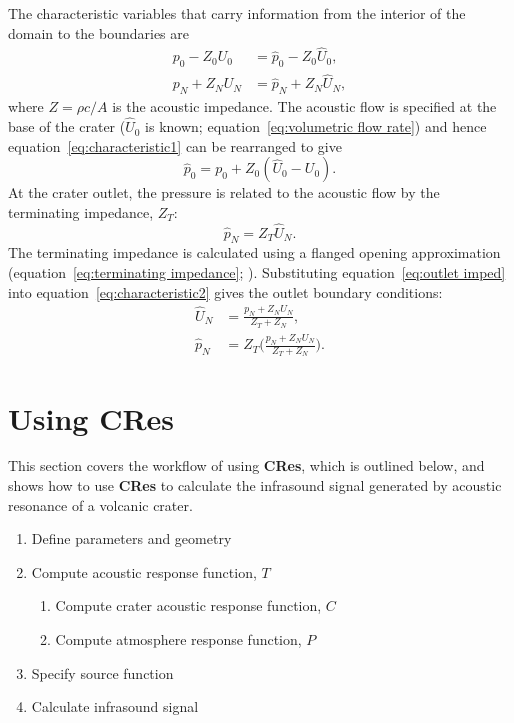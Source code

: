 \documentclass[10pt]{article}
\begin{document}
The characteristic variables that carry information from the interior of the domain to the boundaries are
\begin{align}
p_0-Z_0 U_0 & =\hat{p}_0-Z_0 \hat{U}_0,
\label{eq:characteristic1} \\
p_N+Z_N U_N & = \hat{p}_N+Z_N \hat{U}_N,
\label{eq:characteristic2}
\end{align}
where $Z = \rho c / A$ is the acoustic impedance. The acoustic flow is specified at the base of the crater ($\hat{U}_0$ is known; equation~\ref{eq:volumetric flow rate}) and hence equation~\ref{eq:characteristic1} can be rearranged to give
\begin{equation}
\hat{p}_0 = p_0 + Z_0 (\hat{U}_0 - U_0).
\end{equation}
At the crater outlet, the pressure is related to the acoustic flow by the terminating impedance, $Z_T$:
\begin{equation}
\hat{p}_N = Z_T \hat{U}_N.
\label{eq:outlet imped}
\end{equation}
The terminating impedance is calculated using a flanged opening approximation (equation~\ref{eq:terminating impedance}; \citealp{Kinsler2000, Rossing2004}).
Substituting equation~\ref{eq:outlet imped} into equation~\ref{eq:characteristic2} gives the outlet boundary conditions:
\begin{align}
\hat{U}_N & = \frac{p_N + Z_N U_N}{Z_T+Z_N}, \\
\hat{p}_N & = Z_T \bigg( \frac{p_N + Z_N U_N}{Z_T+Z_N} \bigg).
\end{align}


\section{Using {\bf CRes}}
This section covers the workflow of using {\bf CRes}, which is outlined below, and shows how to use {\bf CRes} to calculate the infrasound signal generated by acoustic resonance of a volcanic crater.
\begin{enumerate}
\item Define parameters and geometry
\item Compute acoustic response function, $T$
\begin{enumerate}
\item Compute crater acoustic response function, $C$
\item Compute atmosphere response function, $P$
\end{enumerate}
\item Specify source function
\item Calculate infrasound signal 
\end{enumerate}
\end{document}
